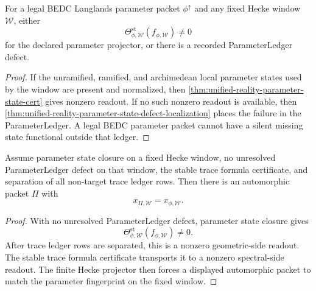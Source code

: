 \begin{theorem}
\label{thm:unified-reality-parameter-state-closure}
For a legal BEDC Langlands parameter packet $\phi^{\uparrow}$ and any
fixed Hecke window $\mathcal W$, either
$$
\Theta_{\phi,\mathcal W}^{\mathrm{st}}(f_{\phi,\mathcal W})\ne0
$$
for the declared parameter projector, or there is a recorded
ParameterLedger defect.
\end{theorem}
\begin{proof}
If the unramified, ramified, and archimedean local parameter states used
by the window are present and normalized, then
\autoref{thm:unified-reality-parameter-state-cert} gives nonzero
readout. If no such nonzero readout is available, then
\autoref{thm:unified-reality-parameter-state-defect-localization} places
the failure in the ParameterLedger. A legal BEDC parameter packet cannot
have a silent missing state functional outside that ledger.
\end{proof}

\begin{theorem}
\label{thm:unified-reality-parameter-state-stable-trace-window-realization}
Assume parameter state closure on a fixed Hecke window, no unresolved
ParameterLedger defect on that window, the stable trace formula
certificate, and separation of all non-target trace ledger rows. Then
there is an automorphic packet $\Pi$ with
$$
x_{\Pi,\mathcal W}=x_{\phi,\mathcal W}.
$$
\end{theorem}
\begin{proof}
With no unresolved ParameterLedger defect, parameter state closure gives
$$
\Theta_{\phi,\mathcal W}^{\mathrm{st}}(f_{\phi,\mathcal W})\ne0.
$$
After trace ledger rows are separated, this is a nonzero geometric-side
readout. The stable trace formula certificate transports it to a
nonzero spectral-side readout. The finite Hecke projector then forces a
displayed automorphic packet to match the parameter fingerprint on the
fixed window.
\end{proof}

